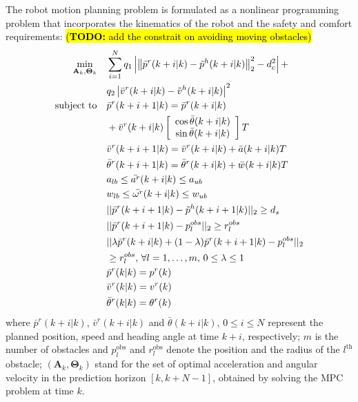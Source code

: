 \documentclass[letterpaper, 10 pt, conference]{ieeeconf}
\newcommand{\todohere}[1]{\hl{(\textbf{TODO:} #1)}}
\begin{document}
	The robot motion planning problem is formulated as a nonlinear programming problem that incorporates the kinematics of the robot and the safety and comfort requirements:
	\todohere{add the constrait on avoiding moving obstacles}
	\begin{subequations}\label{eqn:path_plan_mpc}
		\begin{align}
		\min_{\mathbf{A}_k,\mathbf{\Theta}_k} \quad &\sum\limits_{i=1}^{N} q_1\left| \left\|\bar{p}^r(k+i|k)-\tilde{p}^h(k+i|k)\right\|^2_2-d^2_{c}\right| + \notag\\
		& q_2\left|\bar{v}^r(k+i|k)-\tilde{v}^h(k+i|k)\right|^2\label{eqn:obj}\\
		\text{subject to} \quad & \bar{p}^r(k+i+1|k)=\bar{p}^r(k+i|k)\notag\\
		&+\bar{v}^r(k+i|k)
		\left[ 
		\begin{array}{c}
		\cos \bar{\theta}(k+i|k)\\
		\sin \bar{\theta}(k+i|k)\\
		\end{array}
		\right]T\label{eqn:constr:dyn_pre_motion}\\
		& \bar{v}^r(k+i+1|k)=\bar{v}^r(k+i|k)+\bar{a}(k+i|k)T\label{eqn:constr:dyn_pre_v}\\
		& \bar{\theta}^r(k+i+1|k)=\bar{\theta}^r(k+i|k)+\bar{w}(k+i|k)T\label{eqn:constr:dyn_pre_theta}\\
		& a_{lb}\le \bar{a^r}(k+i|k)\le a_{ub}\label{eqn:constr:a}\\
		& w_{lb}\le \bar{\omega^r}(k+i|k)\le w_{ub}\label{eqn:constr:w}\\
		& ||\bar{p}^r(k+i+1|k)-\tilde{p}^h(k+i+1|k)||_2\geq d_s\label{eqn:constr:safety}\\
		& ||\bar{p}^r(k+i+1|k)-p^{obs}_l||_2\geq r^{obs}_l\label{eqn:constr:obs1}\\
		& ||\lambda \bar{p}^r(k+i|k)+(1-\lambda)\bar{p}^r(k+i+1|k)-p^{obs}_l||_2\notag\\
		& \geq r^{obs}_l,\, \forall l=1,\dots,m,\, 0\le \lambda\le 1\label{eqn:constr:obs2}\\
		& \bar{p}^r(k|k)=p^r(k)\label{eqn:constr:init_z}\\
		& \bar{v}^r(k|k)=v^r(k)\label{eqn:constr:init_v}\\
		& \bar{\theta}^r(k|k)=\theta^r(k)\label{eqn:constr:init_theta}
		\end{align}
	\end{subequations}
	where $\bar{p}^r(k+i|k)$, $\bar{v}^r(k+i|k)$ and $\bar{\theta}(k+i|k),\, 0\le i\le N$ represent the planned position, speed and heading angle at time $k+i$, respectively;
	$m$ is the number of obstacles and $p^{\text{obs}}_l$ and $r^{\text{obs}}_l$ denote the position and the radius of the $l^{\text{th}}$ obstacle;
	$(\mathbf{A}_k,\mathbf{\Theta}_k)$ stand for the set of optimal acceleration and angular velocity in the prediction  horizon $[k,k+N-1]$, obtained by solving the MPC problem at time $k$.
	
\end{document}
